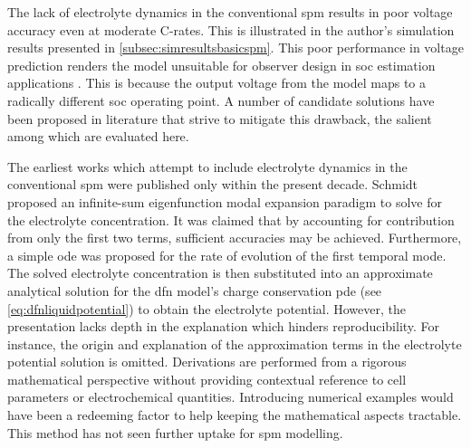 
The lack of electrolyte dynamics in the conventional \gls{spm} results in poor 
voltage accuracy  even at  moderate {C-rates}.  This is illustrated in the
author's simulation results presented in \cref{subsec:simresultsbasicspm}. This
poor performance in voltage prediction renders  the model unsuitable for 
observer design in  \gls{soc} estimation applications . This is because the
output voltage from the model maps  to a radically different \gls{soc} operating
point. A  number of candidate  solutions have  been proposed in  literature that
strive to mitigate  this drawback,  the salient among which are evaluated here.

The  earliest   works  which  attempt  to   include  electrolyte  dynamics
in  the  conventional  \gls{spm}  were   published  only  within  the  present
decade. Schmidt~\etal~\cite{Schmidt2010c} proposed an infinite-sum eigenfunction
modal  expansion  paradigm  to  solve  for  the  electrolyte  concentration.  It
was  claimed  that by  accounting  for  contribution  from  only the  first  two
terms, sufficient  accuracies may be  achieved. Furthermore, a  simple \gls{ode}
was  proposed  for  the rate  of  evolution  of  the  first temporal  mode.  The
solved  electrolyte  concentration  is  then  substituted  into  an  approximate
analytical solution for the \gls{dfn} model's charge conservation \gls{pde} (see
\cref{eq:dfnliquidpotential}) to obtain the  electrolyte potential. However, the
presentation lacks depth  in the explanation which  hinders reproducibility. For
instance,  the  origin  and  explanation  of  the  approximation  terms  in  the
electrolyte  potential solution  is omitted.  Derivations are  performed from  a
rigorous mathematical perspective without providing contextual reference to cell
parameters or  electrochemical quantities. Introducing numerical  examples would
have been a redeeming factor to help keeping the mathematical aspects tractable.
This method has not seen further uptake for \gls{spm} modelling.

